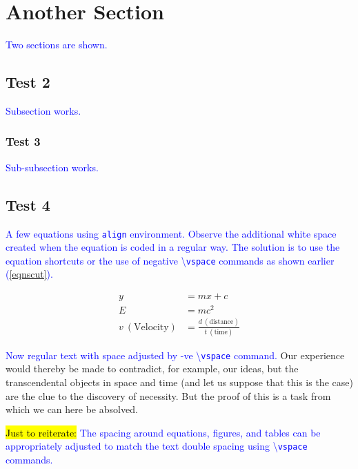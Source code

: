 \documentclass[phd,showframe]{ndsu-thesis-2022}
\newcommand\italk[1]{\textcolor{blue}{#1}}  %
\newcommand\cmd[1]{\textbackslash\texttt{#1}}  %
\begin{document}
\section{Another Section}
\italk{Two sections are shown.} \kant[7]

\subsection{Test 2}
\italk{Subsection works.}

\subsubsection{Test 3}
\italk{Sub-subsection works.}

\mysectop
\subsection{Test 4}
\italk{A few equations using \texttt{align} environment. Observe the additional white space created when the equation is coded in a regular way. The solution is to use the equation shortcuts or the use of negative \cmd{vspace} commands as shown earlier (\cref{eqnscut}).}

\begin{align}
y &= mx + c \\
E &= mc^2 \\
v\: (\text{Velocity}) &= \frac{d\: (\text{distance})}{t\: (\text{time})} 
\end{align}

\vspace{-1.5ex}
\italk{Now regular text with space adjusted by -ve \cmd{vspace} command.} Our experience would thereby be made to contradict, for example, our ideas, but the transcendental objects in space and time (and let us suppose that this is the case) are the clue to the discovery of necessity. But the proof of this is a task from which we can here be absolved.

\vspace{-7pt}

\italk{\hl{Just to reiterate:} The spacing around equations, figures, and tables can be appropriately adjusted to match the text double spacing using \cmd{vspace} commands.}
\end{document}
